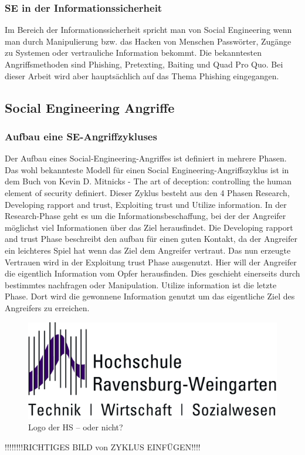\subsubsection{SE in der Informationssicherheit}
Im Bereich der Informationssicherheit spricht man von Social Engineering wenn man durch Manipulierung bzw. das Hacken von Menschen Passwörter, Zugänge zu Systemen oder vertrauliche Information bekommt. Die bekanntesten Angriffsmethoden sind Phishing, Pretexting, Baiting und Quad Pro Quo. Bei dieser Arbeit wird aber hauptsächlich auf das Thema Phishing eingegangen.

\subsection{Social Engineering Angriffe}

\subsubsection{Aufbau eine SE-Angriffzykluses}
Der Aufbau eines Social-Engineering-Angriffes ist definiert in mehrere Phasen. Das wohl bekannteste Modell für einen Social Engineering-Angriffszyklus ist in dem Buch von Kevin D. Mitnicks - The art of deception: controlling the human element of security \cite{ArtOfDeception} definiert. Dieser Zyklus besteht aus den 4 Phasen Research, Developing rapport and trust, Exploiting trust und Utilize information.
In der Research-Phase geht es um die Informationsbeschaffung, bei der der Angreifer möglichst viel Informationen über das Ziel herausfindet. Die Developing rapport and trust Phase beschreibt den aufbau für einen guten Kontakt, da der Angreifer ein leichteres Spiel hat wenn das Ziel dem Angreifer vertraut. Das nun erzeugte Vertrauen wird in der Exploitung trust Phase ausgenutzt. Hier will der Angreifer die eigentlich Information vom Opfer herausfinden. Dies geschieht einerseits durch bestimmtes nachfragen oder Manipulation. Utilize information ist die letzte Phase. Dort wird die gewonnene Information genutzt um das eigentliche Ziel des Angreifers zu erreichen.\\
\FloatBarrier
\begin{figure}
	\begin{center}
		\includegraphics*{bilder/HSLogoWGd}
		\caption{Logo der HS -- oder nicht?}
		\label{fig:logo}
	\end{center}
\end{figure}
\FloatBarrier 
!!!!!!!!RICHTIGES BILD von ZYKLUS EINFÜGEN!!!!\\

